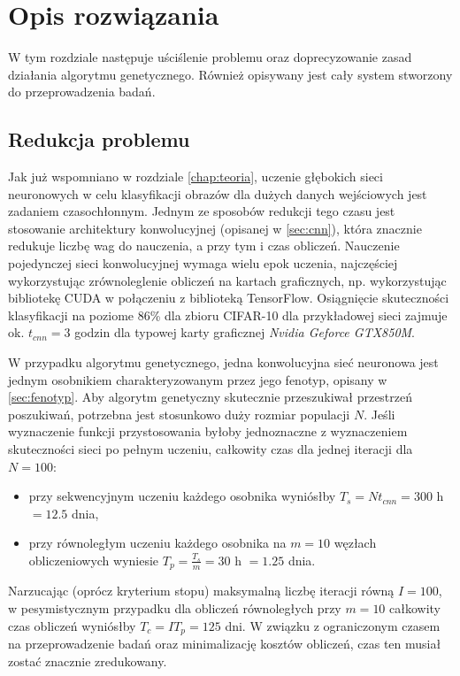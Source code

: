 \chapter{Opis rozwiązania}\label{chap:system_description}
W tym rozdziale następuje uściślenie problemu oraz doprecyzowanie zasad działania algorytmu genetycznego.
Również opisywany jest cały system stworzony do przeprowadzenia badań.
\section{Redukcja problemu}\label{sec:reduction}
Jak już wspomniano w rozdziale \ref{chap:teoria}, uczenie głębokich sieci neuronowych w celu klasyfikacji obrazów dla dużych danych wejściowych jest zadaniem czasochłonnym.
Jednym ze sposobów redukcji tego czasu jest stosowanie architektury konwolucyjnej (opisanej w \ref{sec:cnn}), która znacznie redukuje liczbę wag do nauczenia, a przy tym i czas obliczeń.
Nauczenie pojedynczej sieci konwolucyjnej wymaga wielu epok uczenia, najczęściej wykorzystując zrównoleglenie obliczeń na kartach graficznych, np. wykorzystując bibliotekę CUDA w połączeniu z biblioteką TensorFlow.
Osiągnięcie skuteczności klasyfikacji na poziome 86\% dla zbioru CIFAR-10 dla przykładowej sieci zajmuje ok. $t_{cnn} = 3$ godzin dla typowej karty graficznej \textit{Nvidia Geforce GTX850M}. \cite{tensorflow2015-whitepaper}

W przypadku algorytmu genetycznego, jedna konwolucyjna sieć neuronowa jest jednym osobnikiem charakteryzowanym przez jego fenotyp, opisany w \ref{sec:fenotyp}.
Aby algorytm genetyczny skutecznie przeszukiwał przestrzeń poszukiwań, potrzebna jest stosunkowo duży rozmiar populacji $N$.
Jeśli wyznaczenie funkcji przystosowania byłoby jednoznaczne z wyznaczeniem skuteczności sieci po pełnym uczeniu, całkowity czas dla jednej iteracji dla $N = 100$:
 \begin{itemize}
	\item przy sekwencyjnym uczeniu każdego osobnika wyniósłby $T_s = Nt_{cnn} = 300$ h$ =  12.5 $ dnia,
	\item przy równoległym uczeniu każdego osobnika na $m = 10$ węzłach obliczeniowych wyniesie $T_p = \frac{T_s}{m} = 30$ h $= 1.25$ dnia.
\end{itemize}
Narzucając (oprócz kryterium stopu) maksymalną liczbę iteracji równą $I = 100$, w pesymistycznym przypadku dla obliczeń równoległych przy $m = 10$ całkowity czas obliczeń wyniósłby $T_c=IT_p=125$ dni.
W związku z ograniczonym czasem na przeprowadzenie badań oraz minimalizację kosztów obliczeń, czas ten musiał zostać znacznie zredukowany.


